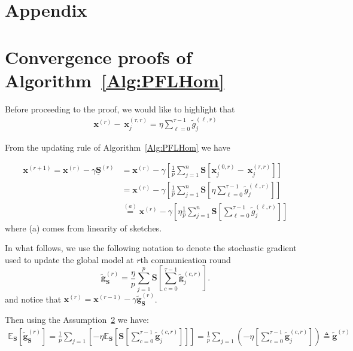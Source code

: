 \section{Appendix}
\section{Convergence proofs of Algorithm~\ref{Alg:PFLHom}}

Before proceeding to the proof, we would like to highlight that 
\begin{align}
    \boldsymbol{x}^{(r)}- ~{\boldsymbol{x}}_{j}^{(\tau,r)}=\eta\sum_{\ell=0}^{\tau-1}\tilde{g}_j^{(\ell,r)}\label{eq:decent-smoothe}
\end{align}

From the updating rule of Algorithm~\ref{Alg:PFLHom} we have


\begin{align}
     {\boldsymbol{x}}^{(r+1)}=\boldsymbol{x}^{(r)}-\gamma\underline{\mathbf{S}}^{(r)}&=\boldsymbol{x}^{(r)}-\gamma\left[\frac{1}{p}\sum_{j=1}^n\mathbf{S}\left[\boldsymbol{x}_j^{(0,r)}-~{\boldsymbol{x}}_{j}^{(\tau,r)}\right]\right]\nonumber\\
     &=\boldsymbol{x}^{(r)}-\gamma\left[\frac{1}{p}\sum_{j=1}^n\mathbf{S}\left[\eta\sum_{\ell=0}^{\tau-1}\tilde{g}_j^{(\ell,r)}\right]\right]\nonumber\\
     &\stackrel{(a)}{=}\boldsymbol{x}^{(r)}-\gamma\left[\eta\frac{1}{p}\sum_{j=1}^n\mathbf{S}\left[\sum_{\ell=0}^{\tau-1}\tilde{g}_j^{(\ell,r)}\right]\right]\label{eq:update-rule-dec}
\end{align}
where (a) comes from linearity of sketches.


In what follows, we use the following notation to denote the stochastic gradient used to update the global model at $r$th communication round $$\tilde{\mathbf{g}}_{\mathbf{S}}^{(r)}=\frac{\eta}{p}\sum_{j=1}^{p}\mathbf{S}\left[\sum_{c=0}^{\tau-1}\tilde{\mathbf{g}}_j^{(c,r)}\right].$$ 
and notice that $\boldsymbol{x}^{(r)} = \boldsymbol{x}^{(r-1)} - \gamma \tilde{\mathbf{g}}_{\mathbf{S}}^{(r)}$.


Then using the Assumption~\ref{} we have:
\begin{align}
  \mathbb{E}_{\mathbf{S}}\left[\tilde{\mathbf{g}}_{\mathbf{S}}^{(r)}\right]=\frac{1}{p}\sum_{j=1}\left[-\eta\mathbb{E}_{\mathbf{S}}\left[ \mathbf{S}\left[\sum_{c=0}^{\tau-1}\tilde{\mathbf{g}}_j^{(c,r)}\right]\right]\right]=\frac{1}{p}\sum_{j=1}\left(-\eta\left[\sum_{c=0}^{\tau-1}\tilde{\mathbf{g}}_j^{(c,r)}\right]\right)\triangleq \tilde{\mathbf{g}}^{(r)}\label{eq:unbiased_gd} 
\end{align}

